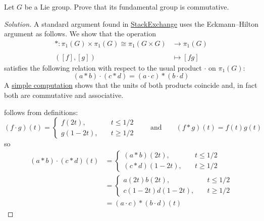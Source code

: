 \documentclass{article}
\begin{document}
\begin{exercise}
	Let $G$ be a Lie group. Prove that its fundamental group is commutative.
\end{exercise}
\begin{proof}[Solution]
	A standard argument found in \href{https://math.stackexchange.com/questions/727999/g-is-topological-implies-pi-1g-e-is-abelian}{StackExchange} uses the Eckmann–Hilton argument as follows. We show that the operation
	\begin{align*}
		*:\pi_1(G)\times\pi_1(G)\cong\pi_1(G\times G)&\longrightarrow\pi_1(G)\\\\
		([f],[g])\qquad\qquad&\mapsto[fg]
	\end{align*}
	satisfies the following relation with respect to the usual product $\cdot$ on $\pi_1(G)$:
	\begin{equation}\label{eq:eck}
		(a*b)\cdot(c*d)=(a\cdot c)*(b\cdot d)
	\end{equation}
	A \href{https://en.wikipedia.org/wiki/Eckmann-Hilton_argument#Proof}{simple computation} shows that the units of both products coincide and, in fact both are commutative and associative.
	
	 follows from definitions:
	\[(f\cdot g)(t)=\begin{cases}
		f(2t), &t\leq 1/2\\
		g(1-2t),\quad &t\geq1/2
	\end{cases}\qquad\text{and}\qquad (f*g)(t)=f(t)g(t)\]
	so
	\begin{align*}
		(a*b)\cdot(c*d)(t)&=\begin{cases}
			(a*b)(2t), &t\leq 1/2\\
			(c*d)(1-2t),\quad &t\geq1/2
		\end{cases}\\
		&=\begin{cases}
			a(2t)b(2t), &t\leq 1/2\\
			c(1-2t)d(1-2t),\quad &t\geq1/2
		\end{cases}\\
		&=(a\cdot c)*(b\cdot d)(t)
	\end{align*}
\end{proof}
\end{document}
